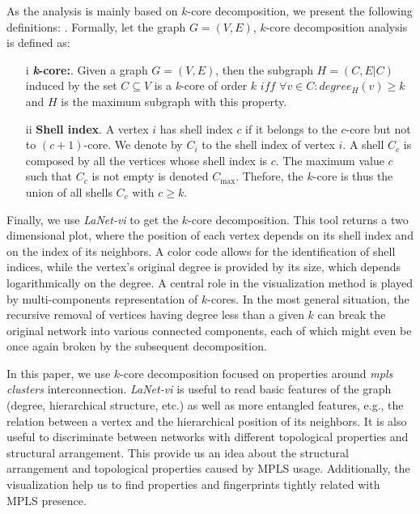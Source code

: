As the analysis is mainly based on $k$-core decomposition, we present the following definitions:
. 
Formally, let the graph $G=(V,E)$, $k$-core decomposition analysis is defined as:

\begin{itemize}
\item[i]{\textbf{\textit{k}-core:}}. Given a graph $G=(V,E)$, then the subgraph $H=(C,E|C)$ induced by the set $ C\subseteq V$ is a \textit{k}-core of order $k$ $iff$ $\forall v \in C: degree_{H}(v)\geq k$ and $H$ is the maximum subgraph with this property.

\item[ii]\textbf{Shell index}. A vertex $i$ has shell index $c$ if it belongs to the $c$-core but not to $(c+1)$-core. 
We denote by $C_i$ to the shell index of vertex $i$. A shell $C_c$ is composed by all the vertices whose shell index is $c$. The maximum value $c$ such that $C_c$ is not empty is denoted $C_{\max}$. 
Thefore, the $k$-core is thus the union of all shells $C_c$ with $c \geq k$.
\end{itemize}

Finally, we use  \textit{LaNet-vi} \cite{Alvarez06k} to get the $k$-core decomposition. 
This tool returns a two dimensional plot, where the position of each vertex depends on its shell index and on the index of its neighbors. 
A color code allows for the identification of shell indices, while the vertex's original degree is provided by its size, which depends logarithmically on the degree.
A central role in the visualization method is played by multi-components representation of $k$-cores. 
In the most general situation, the recursive removal of vertices having degree less than a given $k$ can break the original network into various connected components, each of which might even be once again broken by the subsequent decomposition.

In this paper, we use $k$-core decomposition focused on properties around \textit{mpls clusters} interconnection. 
 \textit{LaNet-vi} is useful to read basic features of the graph (degree, hierarchical structure, etc.) as well as more entangled features, e.g., the relation between a vertex and the hierarchical position of its neighbors. 
It is also useful to  discriminate between networks with different topological properties and structural arrangement.
This provide us an idea about the structural arrangement and topological properties caused by MPLS usage. 
Additionally,  the visualization help us to find properties and fingerprints tightly related with MPLS presence.


